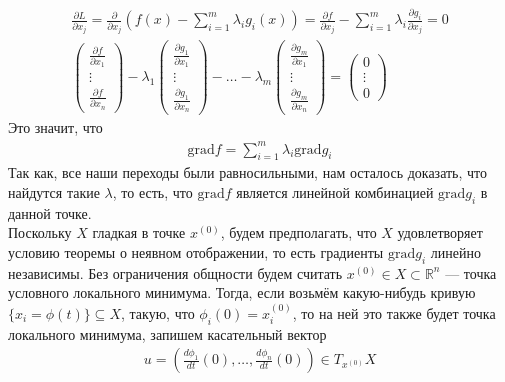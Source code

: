 \documentclass{article}
\begin{document}
\begin{gather*}
    \frac{\partial L}{\partial x_j} = \frac{\partial}{\partial x_j} (f(x) - \sum_{i=1}^m \lambda_i g_i(x)) = \frac{\partial  f}{\partial x_j} - \sum_{i=1}^m \lambda_i \frac{\partial g_i}{\partial x_j} = 0\\
    \begin{pmatrix}
        \frac{\partial f}{\partial x_1} \\
        \vdots\\
        \frac{\partial f}{\partial x_n}
    \end{pmatrix}
    - \lambda_1 \begin{pmatrix}
        \frac{\partial g_1}{\partial x_1} \\
        \vdots\\
        \frac{\partial g_1}{\partial x_n}
    \end{pmatrix}
    - \dotsc
    - \lambda_m \begin{pmatrix}
        \frac{\partial g_m}{\partial x_1} \\
        \vdots\\
        \frac{\partial g_m}{\partial x_n}
    \end{pmatrix} = \begin{pmatrix}
        0\\
        \vdots\\
        0
    \end{pmatrix}
\end{gather*}
Это значит, что
\begin{gather*}
    \mathrm{grad}f = \sum_{i=1}^m \lambda_i \mathrm{grad}g_i
\end{gather*}
Так как, все наши переходы были равносильными, нам осталось доказать, что найдутся такие $\lambda$, то есть, что $\mathrm{grad}f$ является линейной комбинацией $\mathrm{grad}g_i$ в данной точке.\\
Поскольку $X$ гладкая в точке $x^{(0)}$, будем предполагать, что $X$ удовлетворяет условию теоремы о неявном отображении, то есть градиенты $\mathrm{grad}g_i$ линейно независимы. Без ограничения общности будем считать $x^{(0)}\in X \subset \mathbb{R}^n$ --- точка условного локального минимума. Тогда, если возьмём какую-нибудь кривую $\{x_i=\phi(t)\} \subseteq X$, такую, что $\phi_i(0)=x_i^{(0)}$, то на ней это также будет точка локального минимума, запишем касательный вектор
\begin{gather*}
    u = (\frac{d\phi_1}{dt}(0),\dotsc,\frac{d\phi_n}{dt}(0)) \in T_{x^{(0)}}X
\end{gather*}
\end{document}
